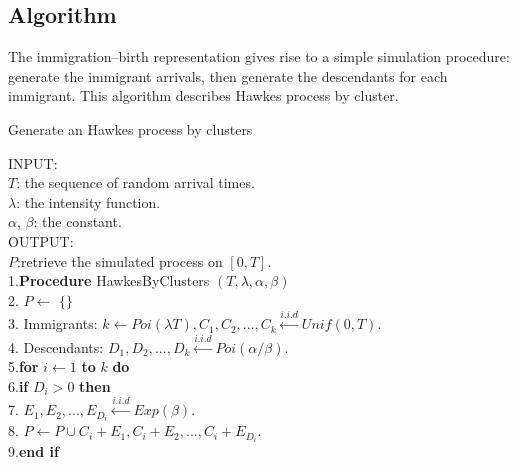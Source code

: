 \subsection{Algorithm}
The immigration–birth representation gives rise to a simple simulation procedure: generate the immigrant arrivals, then generate the descendants for each immigrant. This algorithm describes Hawkes process by cluster.
\begin{breakablealgorithm}
	\caption{Generate an Hawkes process by clusters}
	\label{Alg:Hawkes_clusters}
	\begin{algorithmic}[H] \item
		\begin{tabbing}
			INPUT:  \=
			\\
			\> $T$: the sequence of random arrival times.
			\\
			\>$\lambda$: the intensity function.
			\\
			\>$\alpha$, $\beta$: the constant.
			\\
			OUTPUT: 
			\\
			\> $P$:retrieve the simulated process on $ [0, T ]$.
			\\
			1.\= \textbf{Procedure} HawkesByClusters $(T,\lambda, \alpha,\beta)$
			\\
			2.\hspace{0.5cm} $P\leftarrow$ $\{\}$
			\\
			3.\hspace{0.5cm} Immigrants: $k \leftarrow Poi(\lambda T), C_{1}, C_{2}, . . . , C_{k} \xleftarrow{i.i.d} Unif(0, T)$.
			\\
			4.\hspace{0.5cm} Descendants: $D_{1}, D_{2}, . . . , D_{k}
			\xleftarrow{i.i.d} Poi(\alpha / \beta)$.
			\\
			5.\hspace{0.5cm}\textbf{for} $i \leftarrow 1 $ \textbf{to} $k$ \textbf{do}
			\\
			6.\hspace{1cm}\textbf{if} $D_{i} > 0$ \textbf{then}
			\\
			7.\hspace{1.5cm} $E_{1}, E_{2}, . . . , E_{D_{i}} 	\xleftarrow{i.i.d} Exp(\beta)$.
			\\
			8. \hspace{1.5cm} $P \leftarrow P  \cup {C_{i} + E_{1}, C_{i} + E_{2}, . . . , C_{i} + E_{D_{i}}}$.
			\\
			9.\hspace{1cm}\textbf{end if}
			\\

\end{tabbing}
\end{algorithmic}
\end{breakablealgorithm}
